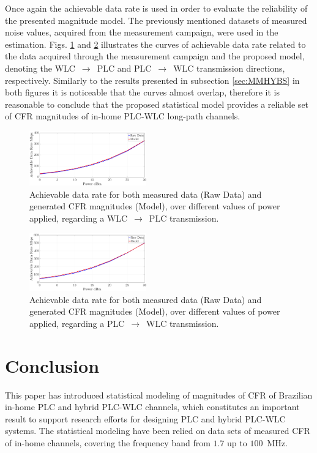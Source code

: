 \documentclass[journal]{IEEEtran}
\begin{document}
Once again the achievable data rate is used in order to evaluate the reliability of the presented magnitude model. The previously mentioned datasets of measured noise values, acquired from the measurement campaign, were used in the estimation. Figs. \ref{Cap_LP_PLC} and \ref{Cap_LP_WLC} illustrates the curves of achievable data rate related to the data acquired through the measurement campaign and the proposed model, denoting the \ac{WLC}~$\rightarrow$~\ac{PLC} and \ac{PLC}~$\rightarrow$~\ac{WLC} transmission directions, respectively. Similarly to the results presented in subsection \ref{sec:MMHYBS} in both figures it is noticeable that the curves almost overlap, therefore it is reasonable to conclude that the proposed statistical model provides a reliable set of \ac{CFR} magnitudes of in-home \ac{PLC}-\ac{WLC} long-path channels.

\begin{figure}[h]
	\centering
	\includegraphics[width=0.45\textwidth]{images/Capacidade_LP_PLCnoise.eps}
	\caption{Achievable data rate for both measured data (Raw Data) and generated CFR magnitudes (Model), over different values of power applied, regarding a WLC~$\rightarrow$~PLC transmission.}
	\label{Cap_LP_PLC}
\end{figure}

\begin{figure}[h]
	\centering
	\includegraphics[width=0.45\textwidth]{images/Capacidade_LP_WLCnoise.eps}
	\caption{Achievable data rate for both measured data (Raw Data) and generated CFR magnitudes (Model), over different values of power applied, regarding a PLC~$\rightarrow$~WLC transmission.}
	\label{Cap_LP_WLC}
\end{figure}

\section{Conclusion}
This paper has introduced statistical modeling of magnitudes of \ac{CFR} of Brazilian in-home \ac{PLC} and hybrid \ac{PLC}-\ac{WLC} channels, which constitutes an important result to support research efforts for designing \ac{PLC} and hybrid \ac{PLC}-\ac{WLC} systems. The statistical modeling have been relied on data sets of measured \ac{CFR} of in-home channels, covering the frequency band from $1.7$ up to $100$~MHz. 
\end{document}
